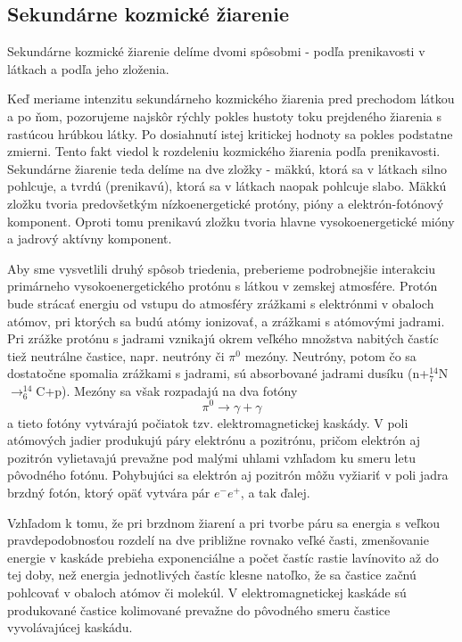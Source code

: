 \documentclass[../../main.tex]{subfiles}
\begin{document}
\subsection{Sekundárne kozmické žiarenie}

Sekundárne kozmické žiarenie delíme dvomi spôsobmi - podľa prenikavosti v látkach a podľa jeho zloženia.

Keď meriame intenzitu sekundárneho kozmického žiarenia pred prechodom látkou a po ňom, pozorujeme najskôr rýchly pokles hustoty toku prejdeného žiarenia s rastúcou hrúbkou látky. Po dosiahnutí istej kritickej hodnoty sa pokles podstatne zmierni. Tento fakt viedol k rozdeleniu kozmického žiarenia podľa prenikavosti. Sekundárne žiarenie teda delíme na dve zložky - mäkkú, ktorá sa v látkach silno pohlcuje, a tvrdú (prenikavú), ktorá sa v látkach naopak pohlcuje slabo. Mäkkú zložku tvoria predovšetkým nízkoenergetické protóny, pióny a elektrón-fotónový komponent. Oproti tomu prenikavú zložku tvoria hlavne vysokoenergetické mióny a jadrový aktívny komponent.

Aby sme vysvetlili druhý spôsob triedenia, preberieme podrobnejšie interakciu primárneho vysokoenergetického protónu s látkou v zemskej atmosfére. Protón bude strácať energiu od vstupu do atmosféry zrážkami s elektrónmi v obaloch atómov, pri ktorých sa budú atómy ionizovať, a zrážkami s atómovými jadrami. Pri zrážke protónu s jadrami vznikajú okrem veľkého množstva nabitých častíc tiež neutrálne častice, napr. neutróny či $\pi^0$ mezóny. Neutróny, potom čo sa dostatočne spomalia zrážkami s jadrami, sú absorbované jadrami dusíku (n+$^{14}_7$N$\rightarrow ^{14}_6$C+p). Mezóny sa však rozpadajú na dva fotóny
\begin{equation}
\pi^0\rightarrow \gamma + \gamma
\end{equation}
a tieto fotóny vytvárajú počiatok tzv. elektromagnetickej kaskády. V poli atómových jadier produkujú páry elektrónu a pozitrónu, pričom elektrón aj pozitrón vylietavajú prevažne pod malými uhlami vzhľadom ku smeru letu pôvodného fotónu. Pohybujúci sa elektrón aj pozitrón môžu vyžiariť v poli jadra brzdný fotón, ktorý opäť vytvára pár $e^-e^+$, a tak ďalej.

 Vzhľadom k tomu, že pri brzdnom žiarení a pri tvorbe páru sa energia s veľkou pravdepodobnosťou rozdelí na dve približne rovnako veľké časti, zmenšovanie energie v kaskáde prebieha exponenciálne a počet častíc rastie lavínovito až do tej doby, než energia jednotlivých častíc klesne natoľko, že sa častice začnú pohlcovať v obaloch atómov či molekúl. V elektromagnetickej kaskáde sú produkované častice kolimované prevažne do pôvodného smeru častice vyvolávajúcej kaskádu.
 
\end{document}
